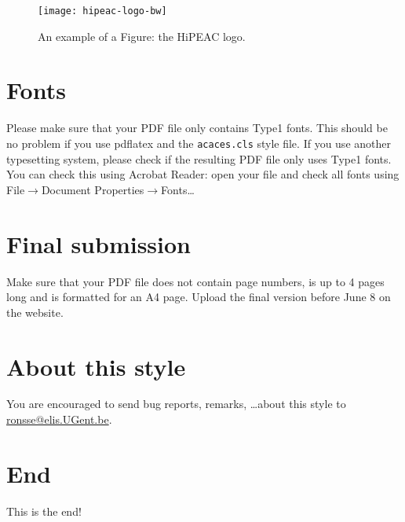 \documentclass{acaces}
\begin{document}
\begin{figure}
\centering
\texttt{[image: hipeac-logo-bw]}
\caption{An example of a Figure: the HiPEAC logo.}
\label{logo}
\end{figure}


\section{Fonts}
Please make sure that your PDF file only contains Type1 fonts. This should be
no problem if you use pdflatex and the {\tt acaces.cls} style file. If you use
another typesetting system, please check if the resulting PDF file only uses
Type1 fonts.  You can check this using Acrobat Reader: open your file and
check all fonts using File$\rightarrow$Document Properties$\rightarrow$Fonts\ldots

\section{Final submission}
Make sure that your PDF file does not contain page numbers, is
up to 4 pages long and is formatted for an A4 page.
Upload the final version before June 8 on the website.

\section{About this style}
You are encouraged to send bug reports, remarks, \ldots about this style to
\href{mailto:ronsse@elis.UGent.be}{ronsse@elis.UGent.be}.

\section{End}
This is the end! \label{end}


\end{document}
